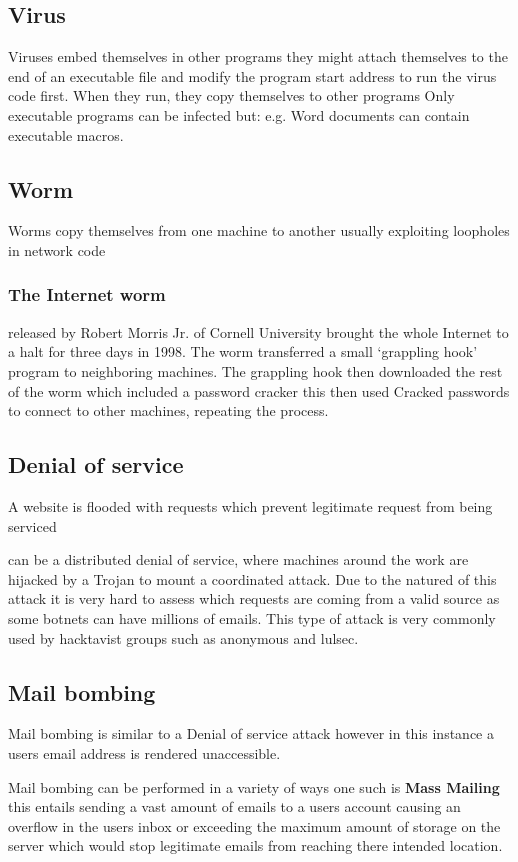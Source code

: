 \documentclass[a4paper,oneside]{report}
\begin{document}
    		\subsection{Virus}
Viruses embed themselves in other programs they might attach themselves to the end of an executable file and modify the program start address to run the virus code first. When they run, they copy themselves to other programs Only executable programs can be infected but: e.g. Word documents can contain executable macros.

	    	\subsection{Worm}
			Worms copy themselves from one machine to another usually exploiting loopholes in network code 
			\subsubsection{The Internet worm} released by Robert Morris Jr. of Cornell University brought the whole Internet to a halt for three days in 1998. The worm transferred a small ‘grappling hook’ program to neighboring machines.
The grappling hook then downloaded the rest of the worm which included a password cracker this then used Cracked passwords to connect to other machines, repeating the process. 


	    	\subsection{Denial of service}
			A website is flooded with requests which prevent legitimate request from being serviced

			can be a distributed denial of service, where machines around the work are hijacked by a Trojan to mount a coordinated attack. Due to the natured of this attack it is very hard to assess which requests are coming from a valid source as some botnets can have millions of emails. This type of attack is very commonly used by hacktavist groups such as anonymous and lulsec.

	    	\subsection{Mail bombing}

			Mail bombing is similar to a Denial of service attack however in this instance a users email address is rendered unaccessible.

Mail bombing can be performed in a variety of ways one such is \textbf{Mass Mailing} this entails sending a vast amount of emails to a users account causing an overflow in the users inbox or exceeding the maximum amount of storage on the server which would stop legitimate emails from reaching there intended location.
\end{document}
